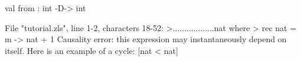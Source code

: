 \chklistingfalse
{}
\begin{ChkListingMsg}
val from : int -D-> int 
\end{ChkListingMsg}
\begin{ChkListingErr}
File "tutorial.zls", line 1-2, characters 18-52:
>..................nat where
>  rec nat = m -> nat + 1
Causality error: this expression may instantaneously depend on itself.
Here is an example of a cycle:
[nat < nat]
\end{ChkListingErr}
